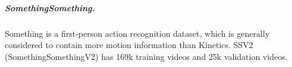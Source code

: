 \subparagraph{SomethingSomething\cite{goyal2017something}.} Something is a first-person action recognition dataset, which is generally considered to contain more motion information than Kinetics. SSV2 (SomethingSomethingV2) has 169k training videos and 25k validation videos.